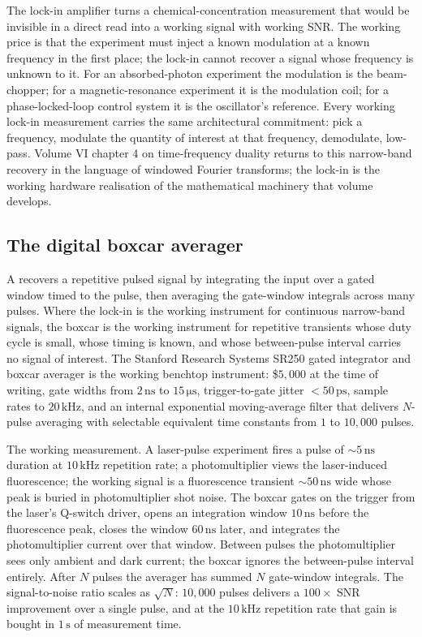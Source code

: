 The lock-in amplifier turns a chemical-concentration measurement
that would be invisible in a direct read into a working signal with
working SNR. The working price is that the experiment must inject a
known modulation at a known frequency in the first place; the
lock-in cannot recover a signal whose frequency is unknown to it.
For an absorbed-photon experiment the modulation is the
beam-chopper; for a magnetic-resonance experiment it is the
modulation coil; for a phase-locked-loop control system it is the
oscillator's reference. Every working lock-in measurement carries
the same architectural commitment: pick a frequency, modulate the
quantity of interest at that frequency, demodulate, low-pass.
Volume VI chapter 4 on time-frequency duality returns to this
narrow-band recovery in the language of windowed Fourier
transforms; the lock-in is the working hardware realisation of the
mathematical machinery that volume develops.

\subsection{The digital boxcar averager}

A  recovers a repetitive pulsed signal by
integrating the input over a gated window timed to the pulse, then
averaging the gate-window integrals across many pulses. Where the
lock-in is the working instrument for continuous narrow-band
signals, the boxcar is the working instrument for repetitive
transients whose duty cycle is small, whose timing is known, and
whose between-pulse interval carries no signal of interest. The
Stanford Research Systems SR250 gated integrator and boxcar
averager \cite{text:ch05t3b-srs-sr250-datasheet} is the working
benchtop instrument: \$$5{,}000$ at the time of writing, gate
widths from $2 \,\si{\nano\second}$ to $15 \,\si{\micro\second}$,
trigger-to-gate jitter $< 50 \,\si{\pico\second}$, sample rates to
$20 \,\si{\kilo\hertz}$, and an internal exponential moving-average
filter that delivers $N$-pulse averaging with selectable equivalent
time constants from $1$ to $10{,}000$ pulses.

The working measurement. A laser-pulse experiment fires a pulse of
$\sim 5 \,\si{\nano\second}$ duration at $10 \,\si{\kilo\hertz}$
repetition rate; a photomultiplier views the laser-induced
fluorescence; the working signal is a fluorescence transient
$\sim 50 \,\si{\nano\second}$ wide whose peak is buried in
photomultiplier shot noise. The boxcar gates on the trigger from
the laser's Q-switch driver, opens an integration window
$10 \,\si{\nano\second}$ before the fluorescence peak, closes the
window $60 \,\si{\nano\second}$ later, and integrates the
photomultiplier current over that window. Between pulses the
photomultiplier sees only ambient and dark current; the boxcar
ignores the between-pulse interval entirely. After $N$ pulses the
averager has summed $N$ gate-window integrals. The signal-to-noise
ratio scales as $\sqrt{N}$: $10{,}000$ pulses delivers a
$100\times$ SNR improvement over a single pulse, and at the
$10 \,\si{\kilo\hertz}$ repetition rate that gain is bought in
$1 \,\si{\second}$ of measurement time.

